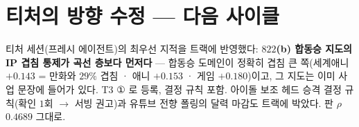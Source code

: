 \documentclass[10pt,a4paper]{article}
\begin{document}
\section{티처의 방향 수정 --- 다음 사이클}

티처 세션(프레시 에이전트)의 최우선 지적을 트랙에 반영했다: \textbf{$822$(b)
합동승 지도의 IP 겹침 통제가 곡선 층보다 먼저다} --- 합동승 도메인이 정확히
겹침 큰 쪽(세계애니 $+0.143$ = 만화와 $29\%$ 겹침 · 애니 $+0.153$ · 게임
$+0.180$)이고, 그 지도는 이미 사업 문장에 들어가 있다. T$3$ ① 로 등록,
결정 규칙 포함. 아이돌 보조 헤드 승격 결정 규칙(확인 $1$회 $\to$ 서빙 권고)과
유튜브 전향 폴링의 달력 마감도 트랙에 박았다. 판 $\rho$ $0.4689$ 그대로.
\end{document}

